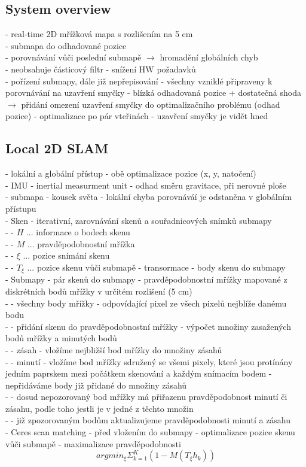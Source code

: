 \documentclass[11pt]{article}
\begin{document}
\subsection{System overview}
- real-time 2D mřížková mapa s rozlišením na 5 cm\\
- submapa do odhadované pozice\\
- porovnávání vůči poslední submapě $\rightarrow$ hromadění globálních chyb\\
- neobsahuje částicový filtr - snížení HW požadavků\\
- pořízení submapy, dále již nepřepisování - všechny vzniklé připraveny k porovnávání na uzavření smyčky - blízká odhadovaná pozice + dostatečná shoda $\rightarrow$ přidání omezení uzavření smyčky do optimalizačního problému (odhad pozice) - optimalizace po pár vteřinách - uzavření smyčky je vidět hned \\

\subsection{Local 2D SLAM}
- lokální a globální přístup - obě optimalizace pozice (x, y, natočení)\\
- IMU - inertial measurment unit - odhad směru gravitace, při nerovné ploše\\
- submapa - kousek světa - lokální chyba porovnáváí je odstaněna v globálním přístupu\\
- Sken - iterativní, zarovnávání skenů a souřadnicových snímků submapy\\
- - $H$ ... informace o bodech skenu\\
- - $M$ ... pravděpodobnostní mřížka\\
- - $\xi$ ... pozice snímání skenu\\
- - $T_{\xi}$ ... pozice skenu vůči submapě - transormace - body skenu do submapy\\
- Submapy - pár skenů do submapy - pravděpodobnostní mřížky mapované z diskrétních bodů mřížky v určitém rozlišení (5 cm)\\
- - všechny body mřížky - odpovídající pixel ze všech pixelů nejblíže danému bodu\\
- - přidání skenu do pravděpodobnostní mřížky - výpočet množiny zasažených bodů mřížky a minutých bodů\\
- - zásah - vložíme nejbližší bod mřížky do množiny zásahů\\
- - minutí - vložíme bod mřížky sdružený se všemi pixely, které jsou protínány jedním paprskem mezi počátkem skenování a každým snímacím bodem - nepřidáváme body již přidané do množiny zásahů\\
- - dosud nepozorovaný bod mřížky má přiřazenu pravděpodobnost minutí či zásahu, podle toho jestli je v jedné z těchto množin\\
- - již zpozorovaným bodům aktualizujeme pravděpodobnosti minutí a zásahu\\
- Ceres scan matching - před vložením do submapy - optimalizace pozice skenu vůči submapě - maximalizace pravděpodobnosti\\
$$argmin_\xi\Sigma^K_{k=1}(1-M(T_{\xi}h_k))$$
\end{document}
